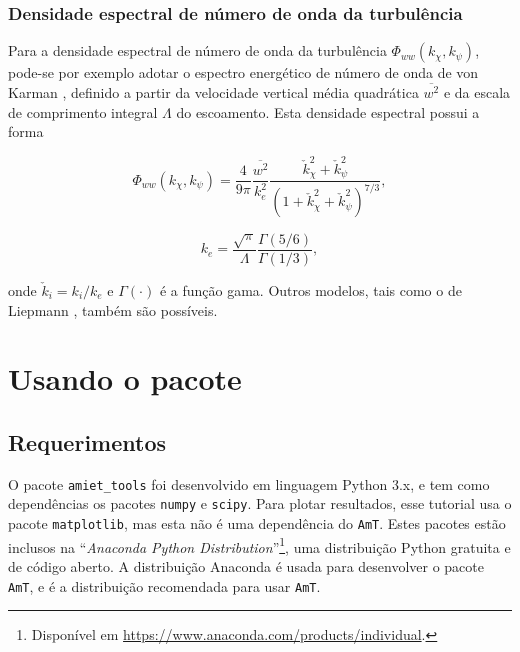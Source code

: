 \documentclass[a4paper, 11pt, twoside]{article}
\newcommand{\AmT}{\texttt{AmT}}
\begin{document}
\subsubsection{Densidade espectral de número de onda da turbulência}

Para a densidade espectral de número de onda da turbulência $\Phi_{ww}(k_\chi, k_\psi)$, pode-se por exemplo adotar o espectro energético de número de onda de von Karman \cite{Amiet75}, definido a partir da velocidade vertical média quadrática $\overline{w^2}$ e da escala de comprimento integral $\Lambda$ do escoamento. Esta densidade espectral possui a forma

\begin{equation}
	\Phi_{ww}(k_\chi, k_\psi) = \frac{4}{9 \pi} \frac{\overline{w^2}}{k_e^2} \frac{\check{k}_\chi^2 + \check{k}_\psi^2}{\left(1 + \check{k}_\chi^2 + \check{k}_\psi^2 \right)^{7/3}},
	\label{eq:vonKarmanModel}
\end{equation}

\begin{equation}
	k_e = \frac{\sqrt{\pi}}{\Lambda} \frac{\Gamma (5/6)}{\Gamma (1/3)},
\end{equation}

\noindent onde $\check{k}_i = k_i/k_e$ e $\Gamma (\cdot)$ é a função gama. Outros modelos, tais como o de Liepmann \cite{Paruchuri2017}, também são possíveis.




\clearpage
\newpage
\section{Usando o pacote}
\label{Sec:UsingThePackage}

\subsection{Requerimentos}

O pacote \verb|amiet_tools| foi desenvolvido em linguagem Python 3.x, e tem como dependências os pacotes \verb|numpy| e \verb|scipy|. Para plotar resultados, esse tutorial usa o pacote \verb|matplotlib|, mas esta não é uma dependência do \AmT{}. Estes pacotes estão inclusos na ``\emph{Anaconda Python Distribution}''\footnote{Disponível em \url{https://www.anaconda.com/products/individual}.}, uma distribuição Python gratuita e de código aberto. A distribuição Anaconda é usada para desenvolver o pacote \AmT{}, e é a distribuição recomendada para usar \AmT{}.
\end{document}

